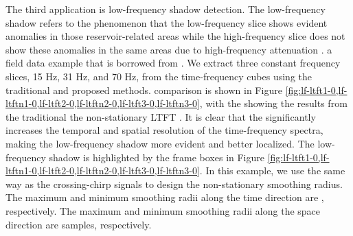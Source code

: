 The third application is low-frequency shadow detection. The low-frequency shadow refers to the phenomenon that the low-frequency slice shows evident anomalies in those reservoir-related areas while the high-frequency slice does not show these anomalies in the same areas due to high-frequency attenuation \cite[]{castagna2003instantaneous}.  a field data example that is borrowed from \cite{guochang20113}. We extract three constant frequency slices,  15 Hz, 31 Hz, and 70 Hz, from the time-frequency cubes using the traditional and proposed methods.  comparison is shown in Figure \ref{fig:lf-ltft1-0,lf-ltftn1-0,lf-ltft2-0,lf-ltftn2-0,lf-ltft3-0,lf-ltftn3-0}, with the  showing the results from the traditional  the non-stationary LTFT . It is clear that the  significantly increases the temporal and spatial resolution of the time-frequency spectra, making the low-frequency shadow more evident and better localized. The low-frequency shadow is highlighted by the frame boxes in Figure \ref{fig:lf-ltft1-0,lf-ltftn1-0,lf-ltft2-0,lf-ltftn2-0,lf-ltft3-0,lf-ltftn3-0}. In this example, we use the same way as the crossing-chirp signals to design the non-stationary smoothing radius. The maximum and minimum smoothing radii along the time direction are , respectively. The maximum and minimum smoothing radii along the space direction are  samples, respectively.



